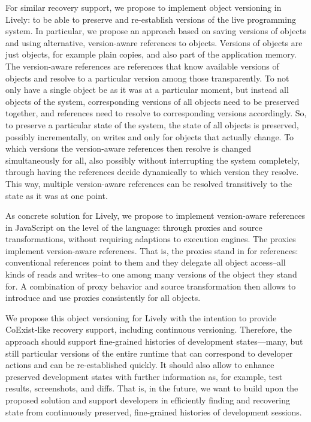 For similar recovery support, we propose to implement object versioning in Lively: to be able to preserve and re-establish versions of the live programming system.
In particular, we propose an approach based on saving versions of objects and using alternative, version-aware references to objects.
Versions of objects are just objects, for example plain copies, and also part of the application memory.
The version-aware references are references that know available versions of objects and resolve to a particular version among those transparently.
To not only have a single object be as it was at a particular moment, but instead all objects of the system, corresponding versions of all objects need to be preserved together, and references need to resolve to corresponding versions accordingly.
So, to preserve a particular state of the system, the state of all objects is preserved, possibly incrementally, on writes and only for objects that actually change.
To which versions the version-aware references then resolve is changed simultaneously for all, also possibly without interrupting the system completely, through having the references decide dynamically to which version they resolve.
This way, multiple version-aware references can be resolved transitively to the state as it was at one point.

As concrete solution for Lively, we propose to implement version-aware references in JavaScript on the level of the language: through proxies and source transformations, without requiring adaptions to execution engines.
The proxies implement version-aware references.
That is, the proxies stand in for references: conventional references point to them and they delegate all object access--all kinds of reads and writes--to one among many versions of the object they stand for.
A combination of proxy behavior and source transformation then allows to introduce and use proxies consistently for all objects.

We propose this object versioning for Lively with the intention to provide CoExist-like recovery support, including continuous versioning.
Therefore, the approach should support fine-grained histories of development states---many, but still particular versions of the entire runtime that can correspond to developer actions and can be re-established quickly.
It should also allow to enhance preserved development states with further information as, for example, test results, screenshots, and diffs.
That is, in the future, we want to build upon the proposed solution and support developers in efficiently finding and recovering state from continuously preserved, fine-grained histories of development sessions.\\

